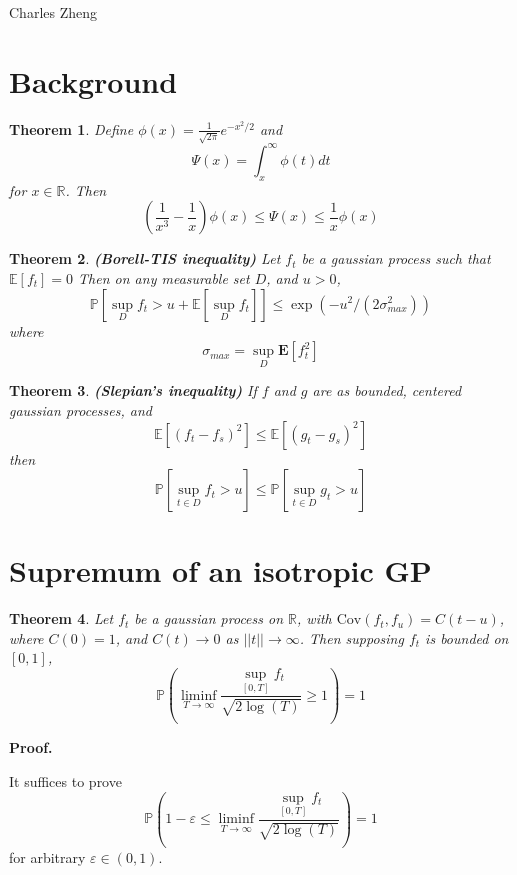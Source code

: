 \documentclass[11pt]{article}
\begin{document}
\newcommand{\tr}{\text{tr}}
\newcommand{\E}{\textbf{E}}
\newcommand{\diag}{\text{diag}}
\newcommand{\argmax}{\text{argmax}}
\newcommand{\Cov}{\text{Cov}}
\newcommand{\Var}{\text{Var}}
\newtheorem{theorem}{Theorem}

Charles Zheng

\section{Background}

\begin{theorem}
\label{bound}
Define $\phi(x) = \frac{1}{\sqrt{2\pi}}e^{-x^2/2}$ and
\[
\Psi(x) = \int_x^\infty \phi(t) dt
\]
for $x \in \mathbb{R}$.
Then
\[
\left(\frac{1}{x^3}-\frac{1}{x}\right) \phi(x) \leq \Psi(x) \leq \frac{1}{x}\phi(x)
\]
\end{theorem}

\begin{theorem}
\label{bt}
\textbf{(Borell-TIS inequality)}
Let $f_t$ be a gaussian process such that $\mathbb{E}[f_t] = 0$
Then on any measurable set $D$, and $u > 0$, 
\[
\mathbb{P}[\sup_D f_t > u + \mathbb{E}[\sup_D f_t]] \leq \exp(-u^2/(2\sigma_{max}^2))
\]
where
\[
\sigma_{max} = \sup_D \E[f_t^2]
\]
\end{theorem}

\begin{theorem}\label{slepian}
\textbf{(Slepian's inequality)}
If $f$ and $g$ are as bounded, centered gaussian processes, and
\[
\mathbb{E}[(f_t-f_s)^2] \leq \mathbb{E}[(g_t-g_s)^2]
\]
then
\[
\mathbb{P}[\sup_{t \in D} f_t  > u] \leq \mathbb{P}[\sup_{t \in D} g_t  > u]
\]
\end{theorem}

\section{Supremum of an isotropic GP}

\begin{theorem}
Let $f_t$ be a gaussian process on $\mathbb{R}$, with $\Cov(f_t,f_u)
= C(t-u)$, where $C(0) = 1$, and $C(t) \to 0$ as $||t|| \to \infty$.
Then supposing $f_t$ is bounded on $[0,1]$,
\[
\mathbb{P}\left(\liminf_{T \to \infty}\frac{\sup_{[0,T]}
    f_t}{\sqrt{2 \log(T)}} \geq 1
\right) = 1
\]
\end{theorem}

\noindent\textbf{Proof.}

It suffices to prove
\[
\mathbb{P}\left( 1-\varepsilon \leq \liminf_{T \to \infty}\frac{\sup_{[0,T]}
    f_t}{\sqrt{2 \log(T)}}\right) = 1
\]
for arbitrary $\varepsilon \in (0,1)$.
\end{document}
